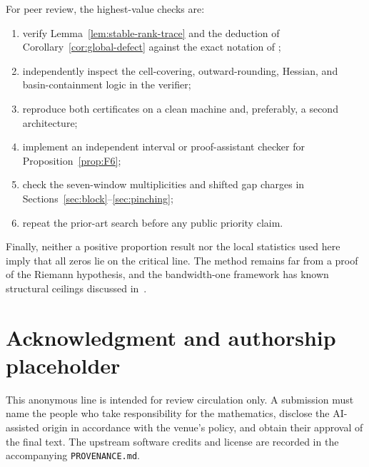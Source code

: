 \documentclass[11pt]{article}
\begin{document}
For peer review, the highest-value checks are:
\begin{enumerate}[leftmargin=*,itemsep=2pt]
 \item verify Lemma~\ref{lem:stable-rank-trace} and the deduction of
 Corollary~\ref{cor:global-defect} against the exact notation of
 \cite{Claude26};
 \item independently inspect the cell-covering, outward-rounding, Hessian,
 and basin-containment logic in the verifier;
 \item reproduce both certificates on a clean machine and, preferably, a
 second architecture;
 \item implement an independent interval or proof-assistant checker for
 Proposition~\ref{prop:F6};
 \item check the seven-window multiplicities and shifted gap charges in
 Sections~\ref{sec:block}--\ref{sec:pinching};
 \item repeat the prior-art search before any public priority claim.
\end{enumerate}

Finally, neither a positive proportion result nor the local statistics used
here imply that all zeros lie on the critical line.  The method remains far
from a proof of the Riemann hypothesis, and the bandwidth-one framework has
known structural ceilings discussed in~\cite{Claude26}.

\section*{Acknowledgment and authorship placeholder}

This anonymous line is intended for review circulation only.  A submission
must name the people who take responsibility for the mathematics, disclose
the AI-assisted origin in accordance with the venue's policy, and obtain
their approval of the final text.  The upstream software credits and license
are recorded in the accompanying \texttt{PROVENANCE.md}.
\end{document}
